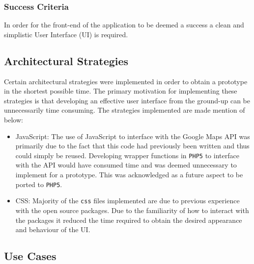\documentclass[10pt,twocolumn]{witseiepaper}
\begin{document}
		\subsubsection{Success Criteria}
		
			In order for the front-end of the application to be deemed a success a clean and simplistic User Interface (UI) is required. 
			
	\subsection{Architectural Strategies}
	
		Certain architectural strategies were implemented in order to obtain a prototype in the shortest possible time. The primary motivation for implementing these strategies is that developing an effective user interface from the ground-up can be unnecessarily time consuming. The strategies implemented are made mention of below:
		
		\begin{itemize}
			\item JavaScript: The use of JavaScript to interface with the Google Maps API was primarily due to the fact that this code had previously been written and thus could simply be reused. Developing wrapper functions in \texttt{PHP5} to interface with the API would have consumed time and was deemed unnecessary to implement for a prototype. This was acknowledged as a future aspect to be ported to \texttt{PHP5}.
			\item CSS: Majority of the \texttt{css} files implemented are due to previous experience with the open source packages. Due to the familiarity of how to interact with the packages it reduced the time required to obtain the desired appearance and behaviour of the UI.
		\end{itemize}
		
	\subsection{Use Cases}
	
\end{document}
